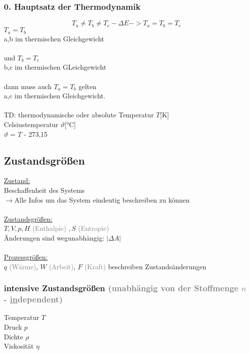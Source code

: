 \documentclass[a4paper]{article}
\begin{document}
\subsubsection{0. Hauptsatz der Thermodynamik}
\begin{equation*}
    T_a \neq T_b \neq T_c -\Delta E -> T_a = T_b = T_c
\end{equation*}
$T_a = T_b$\\
a,b im thermischen Gleichgewicht\\\\
und $T_b = T_c$\\
b,c im thermischen GLeichgewicht\\\\
dann muss auch $T_a = T_b$ gelten\\
a,c im thermischen Gleichgewicht.\\\\
TD: thermodynamische oder absolute Temperatur $T$[K]\\
Celsiustemperatur $\vartheta$[°C]\\
$\vartheta$ = $T$ - 273,15
\subsection{Zustandsgrößen}
\underline{Zustand:}\\
\hspace*{1cm}Beschaffenheit des Systems\\
\hspace*{1.5cm}$\rightarrow$Alle Infos um das System eindeutig beschreiben zu können\\\\
\underline{Zustandsgrößen:}\\
\hspace*{1cm} $T, V, p, H$ \textcolor{gray}{(Enthalpie)} $, S$ \textcolor{gray}{(Entropie)}\\
\hspace*{1cm} Änderungen sind wegunabhängig: $\left|\Delta A \right|$\\\\
\underline{Prozessgrößen:}\\
\hspace*{1cm} $q$ \textcolor{gray}{(Wärme)}, $W$ \textcolor{gray}{(Arbeit)}, $F$ \textcolor{gray}{(Kraft)} beschreiben Zustandsänderungen\\
\subsubsection{intensive Zustandsgrößen \textcolor{gray}{(unabhängig von der Stoffmenge $n$ - \underline{in}dependent)}}
Temperatur $T$\\
Druck $p$\\
Dichte $\rho$\\
Viskosität $\eta$\\
\end{document}
